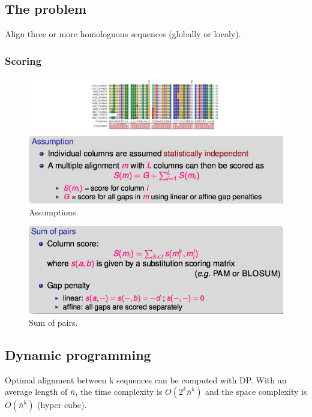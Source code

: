
\subsection{The problem}

Align three or more homologuous sequences (globally or localy).

\subsubsection{Scoring}

\begin{figure}[H]
	\centering
	\includegraphics[scale=0.6]{images/32_assumptions.png}
	\caption{Assumptions.}
\end{figure}

\begin{figure}[H]
	\centering
	\includegraphics[scale=0.6]{images/33_sums.png}
	\caption{Sum of pairs.}
\end{figure}

\subsection{Dynamic programming}

Optimal alignment between k sequences can be computed with DP. With an average length of $\bar{n}$, the time complexity is $O(2^k \bar{n}^k)$ and the space complexity is $O(\bar{n}^k)$ (hyper cube).


